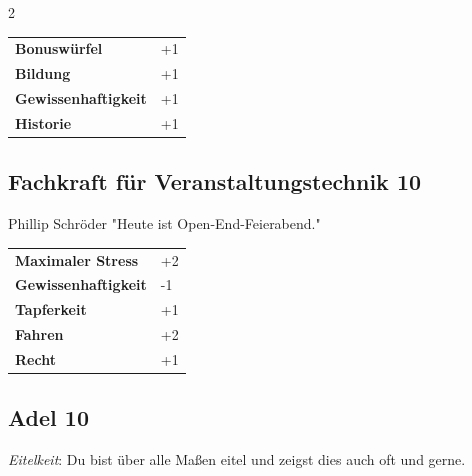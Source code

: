 \begin{multicols}{2}
\begin{tcolorbox}
\begin{tabular}{@{}ll@{}}
    \textbf{Bonuswürfel} & +1\\
    \textbf{Bildung} & +1\\
    \textbf{Gewissenhaftigkeit} & +1\\
    \textbf{Historie} & +1\\
\end{tabular}


\end{tcolorbox}

\begin{tcolorbox}
    \subsection*{Fachkraft für Veranstaltungstechnik \hfill \small{10 }}
    \tcblower


\begin{pquote}{Phillip Schröder}
"Heute ist Open-End-Feierabend."
\end{pquote}

\vspace{3mm}

\begin{tabular}{@{}ll@{}}
    \textbf{Maximaler Stress} & +2\\
    \textbf{Gewissenhaftigkeit} & -1\\
    \textbf{Tapferkeit} & +1\\
    \textbf{Fahren} & +2\\
    \textbf{Recht} & +1\\
\end{tabular}


\end{tcolorbox}

\begin{tcolorbox}
    \subsection*{Adel \hfill \small{10 }}
    \tcblower
\textit{Eitelkeit}: Du bist über alle Maßen eitel und zeigst dies auch oft und gerne.


\end{tcolorbox}
\end{multicols}
